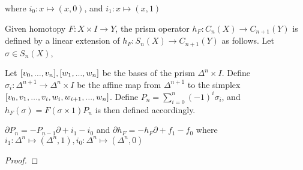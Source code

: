 \documentclass{report}
\begin{document}
where $i_0: x \mapsto (x, 0)$, and $i_1: x \mapsto (x, 1)$

\begin{definition}
    Given homotopy $F: X \times I \to Y$, the prism operator $h_F: C_n(X) \to C_{n+1}(Y)$ is defined by a linear extension of $h_F: S_n(X) \to C_{n+1}(Y)$ as follows. Let $\sigma \in S_n(X)$,
    \begin{center}
    \end{center}
    Let $[v_0, ..., v_n], [w_1, ..., w_n]$ be the bases of the prism $\Delta^n \times I$. Define $\sigma_i: \Delta^{n+1} \to \Delta^n \times I$ be the affine map from $\Delta^{n+1}$ to the simplex $[v_0, v_1, ..., v_i, w_i, w_{i+1}, ..., w_n]$. Define $P_n = \sum_{i=0}^n (-1)^i \sigma_i$, and $h_F(\sigma) = F (\sigma \times 1) P_n$ is then defined accordingly.
\end{definition}

\begin{proposition}
    \label{prop_prism}
    $\partial P_n = -P_{n-1} \partial + i_1 - i_0$
    and 
    $\partial h_{F} = -h_{F} \partial + f_1 - f_0$ where $i_1: \Delta^n \mapsto (\Delta^n, 1), i_0: \Delta^n \mapsto (\Delta^n, 0)$
\end{proposition}

\begin{proof}
\end{proof}
\end{document}
